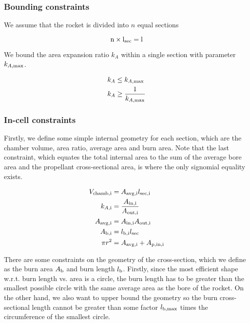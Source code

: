 \subsubsection{Bounding constraints}

We assume that the rocket is divided into $n$ equal sections

\begin{equation}
    \rm{n} \times l_{\rm{sec}} = l
\end{equation}

We bound the area expansion ratio $k_A$ within a single section
with parameter $k_{A, \rm{max}}$.

\begin{align}
    k_A &\leq k_{A,\rm{max}} \\
    k_A &\geq \frac{1}{k_{A,\rm{max}}}
\end{align}

\subsubsection{In-cell constraints}

Firstly, we define some simple internal geometry for each section, which are the
chamber volume, area ratio, average area and burn area.
Note that the last constraint, which equates the total internal area to the
sum of the average bore area and the propellant cross-sectional area,
is where the only signomial equality exists.

\begin{align}
    V_{\rm{chamb}, \rm{i}} &= A_{\rm{avg}, \rm{i}} l_{\rm{sec}, \rm{i}} \\
    k_{A, \rm{i}} &= \frac{A_{\rm{in}, \rm{i}}}{A_{\rm{out}, \rm{i}}}  \\
    A_{\rm{avg, i}} &= A_{\rm{in}, \rm{i}} A_{\rm{out}, \rm{i}} \\
    A_{\rm{b, i}} &= l_{\rm{b,i}} l_{\rm{sec}} \\
    \pi r^2 &= A_{\rm{avg, i}} + A_{\rm{p, in, i}}
\end{align}

There are some constraints on the geometry of the cross-section, which we define
as the burn area $A_{\rm{b}}$ and burn length $l_{\rm{b}}$. Firstly, since the most efficient
shape w.r.t. burn length vs. area is a circle, the burn length has to be greater than the smallest possible circle
with the same average area as the bore of the rocket. On the other hand, we also want to
upper bound the geometry so the burn cross-sectional length cannot be greater than some factor
$l_{\rm{b,max}}$ times the circumference of the smallest circle.


